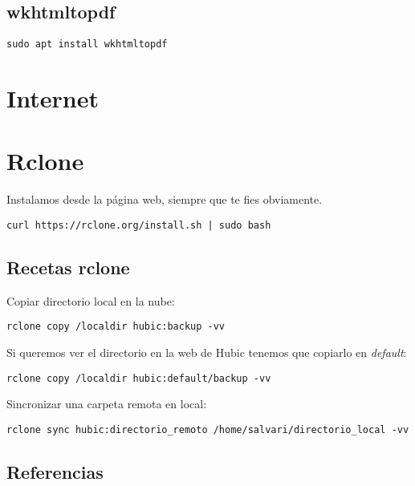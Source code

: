 \documentclass[
  12pt,
  spanish,
]{article}
\begin{document}
\hypertarget{wkhtmltopdf}{%
\subsection{wkhtmltopdf}\label{wkhtmltopdf}}

\begin{verbatim}
sudo apt install wkhtmltopdf
\end{verbatim}

\hypertarget{internet}{%
\section{Internet}\label{internet}}

\hypertarget{rclone}{%
\section{Rclone}\label{rclone}}

Instalamos desde la página web, siempre que te fies obviamente.

\begin{verbatim}
curl https://rclone.org/install.sh | sudo bash
\end{verbatim}

\hypertarget{recetas-rclone}{%
\subsection{Recetas rclone}\label{recetas-rclone}}

Copiar directorio local en la nube:

\begin{verbatim}
rclone copy /localdir hubic:backup -vv
\end{verbatim}

Si queremos ver el directorio en la web de Hubic tenemos que copiarlo en
\emph{default}:

\begin{verbatim}
rclone copy /localdir hubic:default/backup -vv
\end{verbatim}

Sincronizar una carpeta remota en local:

\begin{verbatim}
rclone sync hubic:directorio_remoto /home/salvari/directorio_local -vv
\end{verbatim}

\hypertarget{referencias}{%
\subsection{Referencias}\label{referencias}}
\end{document}
